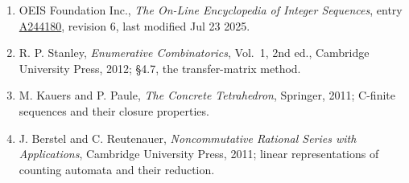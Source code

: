 \documentclass[11pt]{article}
\theoremstyle{definition}
\begin{document}
\begin{enumerate}

\item OEIS Foundation Inc., \emph{The On-Line Encyclopedia of Integer Sequences}, entry \href{https://oeis.org/A244180}{A244180}, revision 6, last modified Jul 23 2025.

\item R. P. Stanley, \emph{Enumerative Combinatorics}, Vol.~1, 2nd ed., Cambridge University Press, 2012; \S4.7, the transfer-matrix method.

\item M. Kauers and P. Paule, \emph{The Concrete Tetrahedron}, Springer, 2011; C-finite sequences and their closure properties.

\item J. Berstel and C. Reutenauer, \emph{Noncommutative Rational Series with Applications}, Cambridge University Press, 2011; linear representations of counting automata and their reduction.

\end{enumerate}
\end{document}

